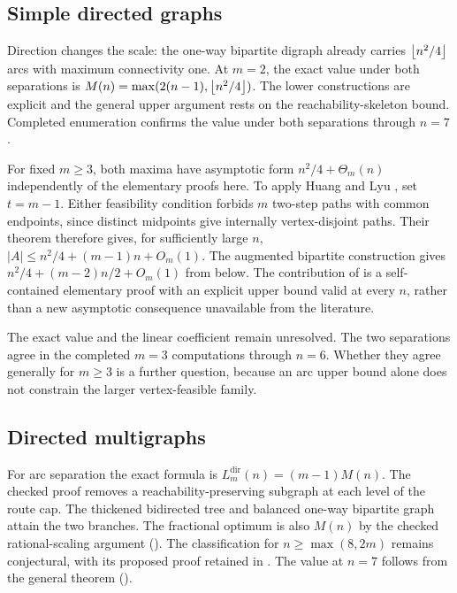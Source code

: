 \subsection{Simple directed graphs}
\label{sec:status-simple-directed}

Direction changes the scale: the one-way bipartite digraph already carries
$\left\lfloor n^2/4 \right\rfloor$ arcs with maximum connectivity one. At $m=2$, the exact
value under both separations is $M(n)=\max(2(n-1),\left\lfloor n^2/4 \right\rfloor)$.
The lower constructions are explicit and the general upper argument rests on
the reachability-skeleton bound. Completed enumeration confirms the value
under both separations through $n=7$.

For fixed $m\ge3$, both maxima have asymptotic form
$n^2/4+\Theta_m(n)$ independently of the elementary proofs here.
To apply Huang and Lyu \cite[Theorem~2]{HuangLyu26}, set $t=m-1$.
Either feasibility condition forbids $m$ two-step paths with common
endpoints, since distinct midpoints give internally vertex-disjoint paths.
Their theorem therefore gives, for sufficiently large $n$,
$|A|\le n^2/4+(m-1)n+O_m(1)$. The augmented bipartite construction gives
$n^2/4+(m-2)n/2+O_m(1)$ from below. The contribution of
 is a
self-contained elementary proof with an explicit upper bound valid at
every $n$, rather than a new asymptotic consequence unavailable from the
literature.

The exact value and the linear coefficient remain unresolved.
The two separations agree in the completed
$m=3$ computations through $n=6$. Whether they agree generally for $m\ge3$
is a further question, because an arc upper bound alone does not constrain
the larger vertex-feasible family.

\subsection{Directed multigraphs}
\label{sec:status-directed-multigraph}

For arc separation the exact formula is
$L_m^{\mathrm{dir}}(n)=(m-1)M(n)$. The checked proof removes a
reachability-preserving subgraph at each level of the route cap.
The thickened bidirected tree and balanced one-way bipartite graph attain
the two branches. The fractional optimum is also $M(n)$ by the checked
rational-scaling argument (). The classification
for $n\ge\max(8,2m)$ remains conjectural, with its proposed proof retained
in . The value at $n=7$ follows
from the general theorem
().

